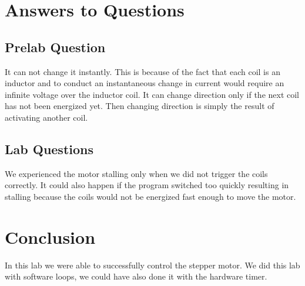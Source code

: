 \documentclass{article}
\begin{document}
	\section*{Answers to Questions}
	\subsection*{Prelab Question}
	It can not change it instantly. This is because of the fact that each coil is an inductor and to conduct an instantaneous change in current would require an infinite voltage over the inductor coil. It can change direction only if the next coil has not been energized yet. Then changing direction is simply the result of activating another coil.
	\subsection*{Lab Questions}
	We experienced the motor stalling only when we did not trigger the coils correctly. It could also happen if the program switched too quickly resulting in stalling because the coils would not be energized fast enough to move the motor.
	\section*{Conclusion}
	In this lab we were able to successfully control the stepper motor. We did this lab with software loops, we could have also done it with the hardware timer.
\end{document}
